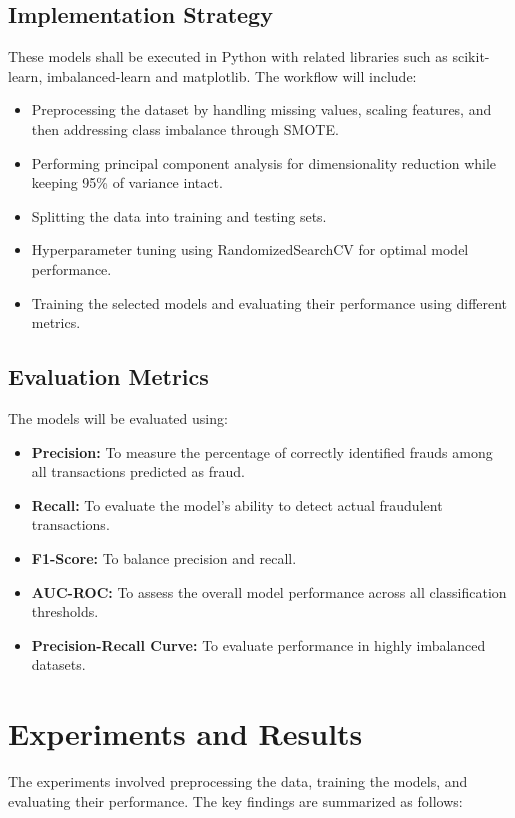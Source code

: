 \documentclass[journal]{IEEEtran}
\begin{document}
\subsection{Implementation Strategy}
These models shall be executed in Python with related libraries such as scikit-learn, imbalanced-learn and matplotlib. The workflow will include:
\begin{itemize}
    \item Preprocessing the dataset by handling missing values, scaling features, and then addressing class imbalance through SMOTE.
    \item Performing principal component analysis for dimensionality reduction while keeping 95\% of variance intact.
    \item Splitting the data into training and testing sets.
    \item Hyperparameter tuning using RandomizedSearchCV for optimal model performance.
    \item Training the selected models and evaluating their performance using different metrics.
\end{itemize}

\subsection{Evaluation Metrics}
The models will be evaluated using:
\begin{itemize}
    \item \textbf{Precision:} To measure the percentage of correctly identified frauds among all transactions predicted as fraud.
    \item \textbf{Recall:} To evaluate the model's ability to detect actual fraudulent transactions.
    \item \textbf{F1-Score:} To balance precision and recall.
    \item \textbf{AUC-ROC:} To assess the overall model performance across all classification thresholds.
    \item \textbf{Precision-Recall Curve:} To evaluate performance in highly imbalanced datasets.
\end{itemize}

\section{Experiments and Results}
The experiments involved preprocessing the data, training the models, and evaluating their performance. The key findings are summarized as follows:
\end{document}
